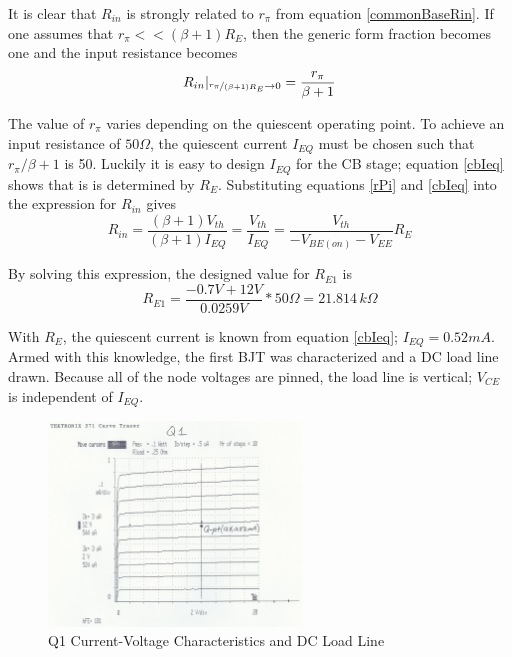 \documentclass[titlepage, letterpaper, 11pt]{article}
\begin{document}
It is clear that $R_{in}$ is strongly related to $r_{\pi}$ from
equation \ref{commonBaseRin}. If one assumes that
$r_{\pi}<<(\beta+1)R_{E}$, then the generic form fraction becomes one
and the input resistance becomes
\begin{equation*}
R_{in}|_{\nicefrac{r_{\pi}}{(\beta+1)R_{E}}\rightarrow 0}
=\frac{r_{\pi}}{\beta+1}
\end{equation*}

The value of $r_{\pi}$ varies depending on the quiescent operating
point. To achieve an input resistance of $50\Omega$, the quiescent
current $I_{EQ}$ must be chosen such that $r_{\pi}/\beta+1$ is 50.
Luckily it is easy to design $I_{EQ}$ for the CB stage; equation
\ref{cbIeq} shows that is is determined by $R_{E}$. Substituting
equations \ref{rPi} and \ref{cbIeq} into the expression for $R_{in}$
gives
\begin{equation*}
R_{in}=\frac{(\beta+1)V_{th}}{(\beta+1)I_{EQ}}=
\frac{V_{th}}{I_{EQ}}=
\frac{V_{th}}{-V_{BE(on)}-V_{EE}}R_{E}
\end{equation*}

By solving this expression, the designed value for $R_{E1}$ is
\begin{equation*}
R_{E1}=\frac{-0.7V+12V}{0.0259V}*50\Omega=21.814\,k\Omega
\end{equation*}

With $R_{E}$, the quiescent current is known from equation
\ref{cbIeq}; $I_{EQ}=0.52mA$. Armed with this knowledge, the first
BJT was characterized and a DC load line drawn. Because all of the
node voltages are pinned, the load line is vertical; $V_{CE}$ is 
independent of $I_{EQ}$.

\begin{figure}[ht]
	\centering
	\includegraphics[width=0.6\textwidth]
		{measurements/q1Characteristics}
	\caption{
		Q1 Current-Voltage Characteristics and DC Load Line
	}
	\label{q1Characteristics}
\end{figure}
\end{document}
